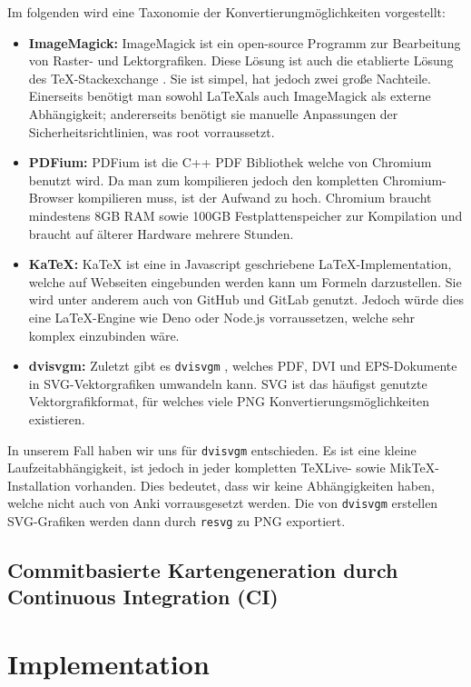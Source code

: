 \documentclass[ngerman]{article}
\begin{document}
Im folgenden wird eine Taxonomie der Konvertierungmöglichkeiten vorgestellt:
\begin{itemize}
  \item \textbf{ImageMagick:} ImageMagick \cite{ImageMagick} ist ein open-source Programm zur Bearbeitung von Raster- und Lektorgrafiken. Diese Lösung ist auch die etablierte Lösung des \TeX-Stackexchange \cite{TeXStackexchange}. Sie ist simpel, hat jedoch zwei große Nachteile. Einerseits benötigt man sowohl \LaTeX als auch ImageMagick als externe Abhängigkeit; andererseits benötigt sie manuelle Anpassungen der Sicherheitsrichtlinien, was root vorraussetzt.
  \item \textbf{PDFium:} PDFium \cite{PDFium} ist die C++ PDF Bibliothek welche von Chromium \cite{Chromium} benutzt wird. Da man zum kompilieren jedoch den kompletten Chromium-Browser kompilieren muss, ist der Aufwand zu hoch. Chromium braucht mindestens 8GB RAM sowie 100GB Festplattenspeicher zur Kompilation und braucht auf älterer Hardware mehrere Stunden.
  \item \textbf{KaTeX:} KaTeX \cite{KaTeX} ist eine in Javascript geschriebene \LaTeX-Implementation, welche auf Webseiten eingebunden werden kann um Formeln darzustellen. Sie wird unter anderem auch von GitHub und GitLab genutzt. Jedoch würde dies eine LaTeX-Engine wie Deno \cite{Deno} oder Node.js \cite{Node} vorraussetzen, welche sehr komplex einzubinden wäre.
  \item \textbf{dvisvgm:} Zuletzt gibt es \texttt{dvisvgm} \cite{dvisvgm}, welches PDF, DVI und EPS-Dokumente in SVG-Vektorgrafiken umwandeln kann. SVG ist das häufigst genutzte Vektorgrafikformat, für welches viele PNG
    Konvertierungsmöglichkeiten existieren.
\end{itemize}

In unserem Fall haben wir uns für \texttt{dvisvgm} entschieden. Es ist eine kleine Laufzeitabhängigkeit, ist jedoch in jeder kompletten TeXLive- sowie MikTeX-Installation vorhanden. Dies bedeutet, dass wir keine Abhängigkeiten haben, welche nicht auch von Anki vorrausgesetzt werden. Die von \texttt{dvisvgm} erstellen SVG-Grafiken werden dann durch \texttt{resvg} \cite{resvg} zu PNG exportiert.

\subsection{Commitbasierte Kartengeneration durch Continuous Integration (CI)}
\section{Implementation}
\end{document}
